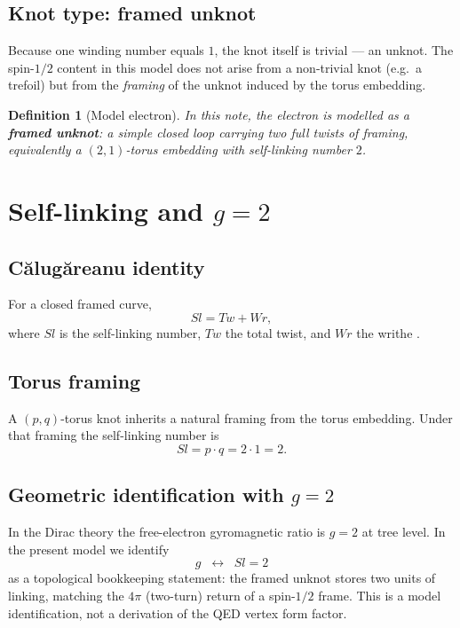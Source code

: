 \documentclass[11pt,a4paper]{article}
\newtheorem{definition}{Definition}
\begin{document}
\subsection{Knot type: framed unknot}

Because one winding number equals $1$, the knot itself is trivial --- an
unknot.  The spin-$1/2$ content in this model does not arise from a
non-trivial knot (e.g.\ a trefoil) but from the \emph{framing} of the
unknot induced by the torus embedding.

\begin{definition}[Model electron]
In this note, the electron is modelled as a \textbf{framed unknot}: a
simple closed loop carrying two full twists of framing, equivalently a
$(2,1)$-torus embedding with self-linking number $2$.
\end{definition}

\section{Self-linking and $g=2$}
\label{sec:g2}

\subsection{C\u{a}lug\u{a}reanu identity}

For a closed framed curve,
\begin{equation}
Sl = Tw + Wr,
\end{equation}
where $Sl$ is the self-linking number, $Tw$ the total twist, and $Wr$ the
writhe \cite{calugareanu1961,white1969,fuller1971}.

\subsection{Torus framing}

A $(p,q)$-torus knot inherits a natural framing from the torus embedding.
Under that framing the self-linking number is
\begin{equation}
\label{eq:sl}
Sl = p\cdot q = 2\cdot 1 = 2.
\end{equation}

\subsection{Geometric identification with $g=2$}

In the Dirac theory the free-electron gyromagnetic ratio is $g=2$ at
tree level.  In the present model we identify
\begin{equation}
\label{eq:g2}
g \;\;\longleftrightarrow\;\; Sl = 2
\end{equation}
as a topological bookkeeping statement: the framed unknot stores two
units of linking, matching the $4\pi$ (two-turn) return of a spin-$1/2$
frame.  This is a model identification, not a derivation of the QED
vertex form factor.
\end{document}
